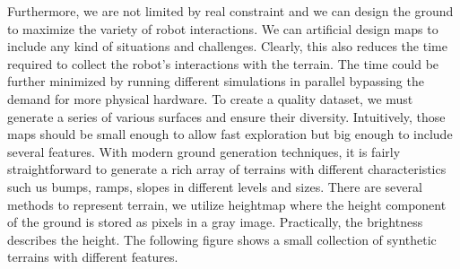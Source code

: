 \documentclass[../document.tex]{subfiles}
\begin{document}
Furthermore, we are not limited by real constraint and we can design the ground to maximize the variety of robot interactions. We can artificial design maps to include any kind of situations and challenges.
Clearly, this also reduces the time required to collect the robot's interactions with the terrain. The time could be further minimized by running different simulations in parallel bypassing the demand for more physical hardware.
To create a quality dataset, we must generate a series of various surfaces and ensure their diversity. Intuitively, those maps should be small enough to allow fast exploration but big enough to include several features. With modern ground generation techniques, it is fairly straightforward to generate a rich array of terrains with different characteristics such us bumps, ramps, slopes in different levels and sizes. There are several methods to represent terrain, we utilize heightmap where the height component of the ground is stored as pixels in a gray image. Practically, the brightness describes the height. The following figure shows a small collection of synthetic terrains with different features.
\end{document}
